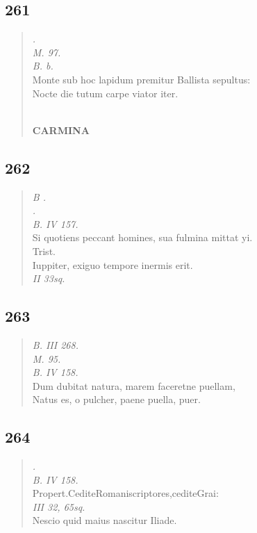\documentclass[11pt, a4paper]{report}
\begin{document}
            \subsection*{261}
      \begin{verse}
      \textit{.} \\ \textit{M. 97.} \\ \textit{ \lbrack B. b.} \\ Monte sub hoc lapidum premitur Ballista sepultus: \\ Nocte die tutum carpe viator iter. \\ 
        ﻿\pagebreak 
    \begin{center} \textbf{CARMINA} \end{center} \marginpar{[214]} 
      \end{verse}
  
            \subsection*{262}
      \begin{verse}
      \textit{B .} \\ \textit{.} \\ \textit{B. IV 157.} \\ Si quotiens peccant homines, sua fulmina mittat yi. \\ Trist. \\ Iuppiter, exiguo tempore inermis erit. \\ \textit{II 33sq.} \\ 
      \end{verse}
  
            \subsection*{263}
      \begin{verse}
      \textit{B. III 268.} \\ \textit{M. 95.} \\ \textit{B. IV 158.} \\ Dum dubitat natura, marem faceretne puellam, \\ Natus es, o pulcher, paene puella, puer. \\ 
      \end{verse}
  
            \subsection*{264}
      \begin{verse}
      \textit{.} \\ \textit{B. IV 158.} \\ Propert.CediteRomaniscriptores,cediteGrai: \\ \textit{III 32, 65sq.} \\ Nescio quid maius nascitur Iliade. \\ 
      \end{verse}
  
\end{document}
